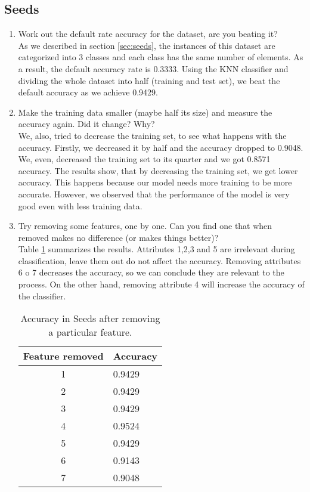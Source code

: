 \documentclass[10pt]{scrartcl}
\begin{document}
\subsection{Seeds}
\begin{enumerate}
 \item Work out the default rate accuracy for the dataset, are you beating it? \\
 As we described in section \ref{sec:seeds}, the instances of this dataset are categorized into 3 classes and each class has the same number of elements. As a result, the default accuracy rate is 0.3333. Using the KNN classifier and dividing the whole dataset into half (training and test set), we beat the default accuracy as we achieve 0.9429.
 
 \item Make the training data smaller (maybe half its size) and measure the accuracy again. Did it change? Why? \\ 
 We, also, tried to decrease the training set, to see what happens with the accuracy. Firstly, we decreased it by half and the accuracy dropped to 0.9048. We, even, decreased the training set to its quarter and we got 0.8571 accuracy. The results show, that by decreasing the training set, we get lower accuracy. This happens because our model needs more training to be more accurate. However, we observed that the performance of the model is very good even with less training data. 
 
 \item Try removing some features, one by one. Can you find one that when removed makes no difference (or makes things better)? \\
 Table \ref{tab:acc3} summarizes the results. Attributes 1,2,3 and 5 are irrelevant during classification, leave them out do not affect the accuracy. Removing attributes 6 o 7 decreases the accuracy, so we can conclude they are relevant to the process.  On the other hand, removing attribute 4 will increase the accuracy of the classifier.

 \begin{table}[h!]
 \centering
 \begin{tabular}{cl}
  \toprule
  \textbf{Feature removed} & \textbf{Accuracy} \\
  \midrule
  1  & 0.9429 \\ 
  2  & 0.9429 \\  
  3  & 0.9429 \\  
  4  & 0.9524 \\  
  5  & 0.9429 \\  
  6  & 0.9143 \\  
  7  & 0.9048 \\
  \bottomrule
 \end{tabular}
 \caption{Accuracy in Seeds after removing a particular feature.}\label{tab:acc3}
 \end{table}


\end{enumerate}
\end{document}
